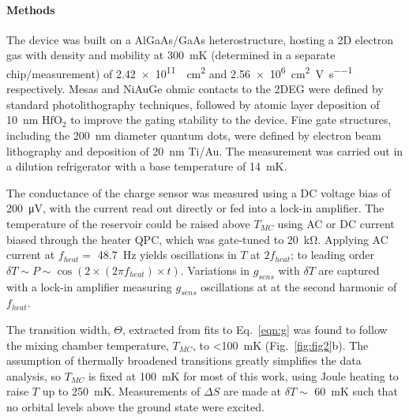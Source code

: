 \documentclass[twocolumn,showpacs,amsmath,amssymb,prl,aps,superscriptaddress]{revtex4-1}
\begin{document}
\paragraph*{Methods} The device was built on a AlGaAs/GaAs heterostructure, hosting a 2D electron gas with density and mobility at \SI{300}{\milli\kelvin} (determined in a separate chip/measurement) of \SI{2.42e11}{\per\square\centi\metre} and \SI[per-mode=symbol]{2.56e6}{\square\centi\metre\per\volt\per\second} respectively.   Mesas and NiAuGe ohmic contacts to the 2DEG were defined by standard photolithography techniques, followed by atomic layer deposition of \SI{10}{\nano\metre} $\mathrm{HfO_2}$ to improve the gating stability to the device. Fine gate structures, including the \SI{200}{\nano\metre} diameter quantum dots, were defined by electron beam lithography and deposition of \SI{20}{\nano\metre} Ti/Au. The measurement was carried out in a dilution refrigerator with a base temperature of \SI{14}{\milli\kelvin}.

The conductance of the charge sensor was measured using a DC voltage bias of \SI{200}{\micro\volt}, with the current read out directly or fed into a lock-in amplifier.  The temperature of the reservoir could be raised above $T_{MC}$ using AC or DC current biased through the heater QPC, which was gate-tuned to \SI{20}{\kilo\ohm}. Applying AC current at $f_{heat} =$ \SI{48.7}{\hertz} yields oscillations in $T$ at $2f_{heat}$; to leading order $\delta T \sim P \sim \cos(2 \times (2 \pi f_{heat}) \times t)$. Variations in $g_{sens}$ with $\delta T$ are captured with a lock-in amplifier measuring $g_{sens}$ oscillations at at the second harmonic of $f_{heat}$.

The transition width, $\Theta$, extracted from fits to Eq.~\ref{eqn:g} was found to follow the mixing chamber temperature, $T_{MC}$, to \SI{<100}{\milli\kelvin} (Fig.~\ref{fig:fig2}b). The assumption of thermally broadened transitions greatly simplifies the data analysis, so $T_{MC}$ is fixed at \SI{100}{\milli\kelvin} for most of this work, using Joule heating to raise $T$ up to \SI{250}{\milli\kelvin}. Measurements of $\Delta S$ are made at $\delta T \sim $ \SI{60}{\milli\kelvin} such that no orbital levels above the ground state were excited.


{}

\end{document}
